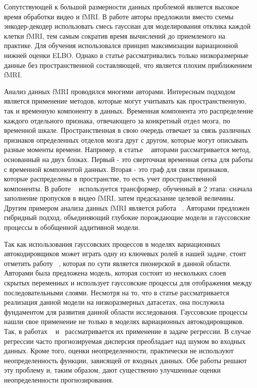 \documentclass{article}
\begin{document}
Сопутствующей к большой размерности данных  проблемой является высокое время обработки видео и fMRI. В работе \cite{rezaei2021real} авторы предложили вместо схемы энкодер-декодер использовать смесь гауссиан для моделирования отклика каждой клетки fMRI, тем самым сократив время вычислений до приемлемого на практике. Для обучения использовался принцип максимизации вариационной нижней оценки ELBO. Однако в статье рассматривались только низкоразмерные данные без пространственной составляющей, что является плохим приближением fMRI. 

Анализ данных fMRI проводился многими авторами. Интересным подходом является применение методов, которые могут учитывать как пространственную, так и временную компоненту в данных. Временная компонента это распределение каждого отдельного признака, отвечающего за конкретный отдел мозга, по временной шкале. Пространственная в свою очередь отвечает за связь различных признаков определенных отделов мозга друг с другом, которые могут описывать разные моменты времени. Например, в статье ~\cite{azevedo2022deep} авторами рассматривается метод, основанный на двух блоках. Первый - это сверточная временная сетка для работы с временной компонентой данных. Вторая - это граф для связи признаков, которые распределены в пространстве, то есть учет пространственной компоненты.  
В работе ~\cite{malkiel2022selfsupervised} используется трансформер, обученный в 2 этапа: сначала заполнение пропусков в видео fMRI, затем предсказание целевой величины. 
Другим примером анализа данных fMRI является работа ~\cite{Albuquerque_FMRI}. Авторами предложен гибридный подход, объединяющий глубокие порождающие модели и гауссовские процессы в обобщенной аддитивной модели.

Так как использования гауссовских процессов в моделях вариационных автокодировщиков может играть одну из ключевых ролей в нашей задаче, стоит отметить работу ~\cite{dai2016variational}, которая по сути является пионерской в данной области. Авторами была предложена модель, которая состоит из нескольких слоев скрытых переменных и использует гауссовские процессы для отображения между последовательными слоями. Несмотря на то, что в статье рассматривается реализация данной модели на низкоразмерных датасетах, она послужила фундаментом для развития данной области исследования. Гауссовские процессы нашли свое применение не только в моделях вариационных автокодировщиков. Так, в работах ~\cite{jankowiak2020parametric} и ~\cite{wang2022intuitive}рассматривается их применение в задаче регрессии. В случае регрессии часто прогнозируемая дисперсия преобладает над шумом во входных данных. Кроме того,  оценки неопределенности,  практически не используют неопределенность функции, зависящей от входных данных. Обе работы решают эту проблему и, таким образом, дают существенно улучшенные оценки неопределенности прогнозирования.
\end{document}
